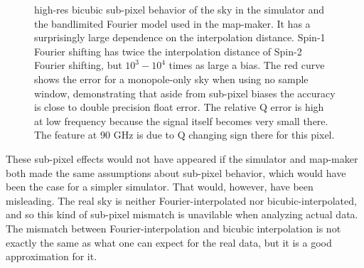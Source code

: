 \documentclass{article}
\begin{document}
\begin{figure}
{	high-res bicubic sub-pixel behavior of the sky in the simulator and the
	bandlimited Fourier model used in the map-maker. It has a surprisingly large
	dependence on the interpolation distance. Spin-1 Fourier shifting has
	twice the interpolation distance of Spin-2 Fourier shifting, but $10^3-10^4$
	times as large a bias. The red curve shows the error for a
	monopole-only sky when using no sample window, demonstrating
	that aside from sub-pixel biases the accuracy is close to double
	precision float error.
	The relative Q error is high at low frequency because the signal itself
	becomes very small there. The feature at 90 GHz is due to Q changing
	sign there for this pixel.
	}
	\label{fig:subpixel-spec}
\end{figure}

These sub-pixel effects would not have appeared if the simulator
and map-maker both made the same assumptions about sub-pixel behavior,
which would have been the case for a simpler simulator.
That would, however, have been misleading. The real sky is neither
Fourier-interpolated nor bicubic-interpolated, and so this kind of
sub-pixel mismatch is unavilable when analyzing actual data. The
mismatch between Fourier-interpolation and bicubic interpolation
is not exactly the same as what one can expect for the real data,
but it is a good approximation for it.


\end{document}
